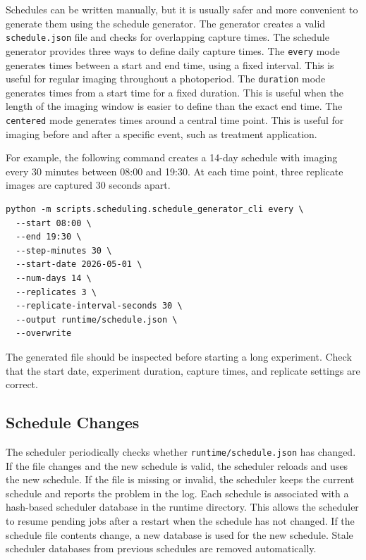 Schedules can be written manually, but it is usually safer and more convenient
to generate them using the schedule generator. The generator creates a valid
\texttt{schedule.json} file and checks for overlapping capture times. The
schedule generator provides three ways to define daily capture times. The
\texttt{every} mode generates times between a start and end time, using a fixed
interval. This is useful for regular imaging throughout a photoperiod. The
\texttt{duration} mode generates times from a start time for a fixed duration.
This is useful when the length of the imaging window is easier to define than
the exact end time. The \texttt{centered} mode generates times around a central
time point. This is useful for imaging before and after a specific event, such
as treatment application.

For example, the following command creates a 14-day schedule with imaging every
30 minutes between 08:00 and 19:30. At each time point, three replicate images
are captured 30 seconds apart.

\begin{verbatim}
python -m scripts.scheduling.schedule_generator_cli every \
  --start 08:00 \
  --end 19:30 \
  --step-minutes 30 \
  --start-date 2026-05-01 \
  --num-days 14 \
  --replicates 3 \
  --replicate-interval-seconds 30 \
  --output runtime/schedule.json \
  --overwrite
\end{verbatim}

The generated file should be inspected before starting a long experiment. Check
that the start date, experiment duration, capture times, and replicate settings
are correct.

\subsection{Schedule Changes}

The scheduler periodically checks whether \texttt{runtime/schedule.json} has
changed. If the file changes and the new schedule is valid, the scheduler
reloads and uses the new schedule. If the file is missing or invalid, the
scheduler keeps the current schedule and reports the problem in the log. Each
schedule is associated with a hash-based scheduler database in the runtime
directory. This allows the scheduler to resume pending jobs after a restart
when the schedule has not changed. If the schedule file contents change, a new
database is used for the new schedule. Stale scheduler databases from previous
schedules are removed automatically.

